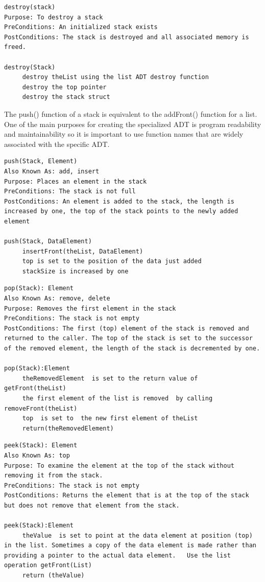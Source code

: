 \begin{lstlisting}
destroy(stack)
Purpose: To destroy a stack
PreConditions: An initialized stack exists
PostConditions: The stack is destroyed and all associated memory is freed.

destroy(Stack)
     destroy theList using the list ADT destroy function
     destroy the top pointer
     destroy the stack struct
\end{lstlisting}



The push() function of a stack is equivalent to the addFront() function for  a list.  One of  the  main purposes for creating the specialized ADT is program readability and maintainability so it is important to use function names that are widely associated with the specific ADT.

\begin{lstlisting}
push(Stack, Element)
Also Known As: add, insert
Purpose: Places an element in the stack
PreConditions: The stack is not full
PostConditions: An element is added to the stack, the length is increased by one, the top of the stack points to the newly added element

push(Stack, DataElement)
     insertFront(theList, DataElement)  
     top is set to the position of the data just added
     stackSize is increased by one
\end{lstlisting}


\begin{lstlisting}
pop(Stack): Element
Also Known As: remove, delete
Purpose: Removes the first element in the stack
PreConditions: The stack is not empty
PostConditions: The first (top) element of the stack is removed and returned to the caller. The top of the stack is set to the successor of the removed element, the length of the stack is decremented by one.

pop(Stack):Element
     theRemovedElement  is set to the return value of getFront(theList)
     the first element of the list is removed  by calling removeFront(theList)
     top  is set to  the new first element of theList 
     return(theRemovedElement)
\end{lstlisting}


\begin{lstlisting}
peek(Stack): Element
Also Known As: top
Purpose: To examine the element at the top of the stack without removing it from the stack.
PreConditions: The stack is not empty
PostConditions: Returns the element that is at the top of the stack but does not remove that element from the stack.

peek(Stack):Element
     theValue  is set to point at the data element at position (top) in the list. Sometimes a copy of the data element is made rather than providing a pointer to the actual data element.   Use the list operation getFront(List)
     return (theValue)
\end{lstlisting}





